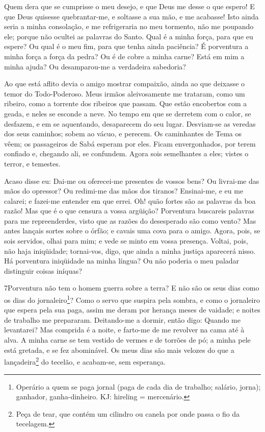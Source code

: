 Quem dera que se cumprisse o meu desejo, e que Deus me desse o que
espero! E que Deus quisesse quebrantar-me, e soltasse a sua mão,
e me acabasse! Isto ainda seria a minha consolação, e me
refrigeraria no meu tormento, não me poupando ele; porque não
ocultei as palavras do Santo. Qual é a minha força, para que
eu espere? Ou qual é o meu fim, para que tenha ainda paciência?
É porventura a minha força a força da pedra? Ou é de cobre a
minha carne? Está em mim a minha ajuda? Ou desamparou-me a
verdadeira sabedoria?

Ao que está aflito devia o amigo mostrar compaixão, ainda ao que
deixasse o temor do Todo-Poderoso. Meus irmãos aleivosamente
me trataram, como um ribeiro, como a torrente dos ribeiros que
passam. Que estão encobertos com a geada, e neles se esconde
a neve. No tempo em que se derretem com o calor, se desfazem,
e em se aquentando, desaparecem do seu lugar. Desviam-se as
veredas dos seus caminhos; sobem ao vácuo, e perecem. Os
caminhantes de Tema os vêem; os passageiros de Sabá esperam por
eles. Ficam envergonhados, por terem confiado e, chegando
ali, se confundem. Agora sois semelhantes a eles; vistes o
terror, e temestes.

Acaso disse eu: Dai-me ou oferecei-me presentes de vossos bens?
Ou livrai-me das mãos do opressor? Ou redimi-me das mãos dos
tiranos? Ensinai-me, e eu me calarei; e fazei-me entender em
que errei. Oh! quão fortes são as palavras da boa razão! Mas
que é o que censura a vossa argüição? Porventura buscareis
palavras para me repreenderdes, visto que as razões do desesperado
são como vento? Mas antes lançais sortes sobre o órfão; e
cavais uma cova para o amigo. Agora, pois, se sois servidos,
olhai para mim; e vede se minto em vossa presença. Voltai,
pois, não haja iniqüidade; tornai-vos, digo, que ainda a minha
justiça aparecerá nisso. Há porventura iniqüidade na minha
língua? Ou não poderia o meu paladar distinguir coisas iníquas?

\medskip

\lettrine{7} Porventura não tem o homem guerra sobre a terra?
E não são os seus dias como os dias do jornaleiro\footnote{Operário
a quem se paga jornal (paga de cada dia de trabalho; salário,
jorna); ganhador, ganha-dinheiro. KJ: hireling = mercenário.}?
Como o servo que suspira pela sombra, e como o jornaleiro que
espera pela sua paga, assim me deram por herança meses de
vaidade; e noites de trabalho me prepararam. Deitando-me a
dormir, então digo: Quando me levantarei? Mas comprida é a noite, e
farto-me de me revolver na cama até à alva. A minha carne se tem
vestido de vermes e de torrões de pó; a minha pele está gretada, e
se fez abominável. Os meus dias são mais velozes do que a
lançadeira\footnote{Peça de tear, que contém um cilindro ou canela
por onde passa o fio da tecelagem.} do tecelão, e acabam-se, sem
esperança.


